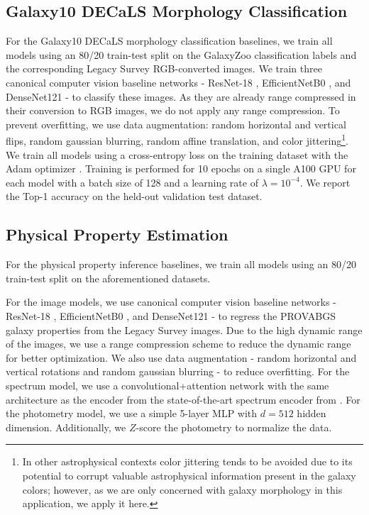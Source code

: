 \subsection{Galaxy10 DECaLS Morphology Classification}
\label{subsec:gz10_baseline}
For the Galaxy10 DECaLS morphology classification baselines, we train all models using an 80/20 train-test split on the GalaxyZoo classification labels and the corresponding Legacy Survey RGB-converted images. We train three canonical computer vision baseline networks - ResNet-18 \citep{he2016deep}, EfficientNetB0 \citep{efficientnet}, and DenseNet121 \citep{huang2017densely} - to classify these images. As they are already range compressed in their conversion to RGB images, we do not apply any range compression. To prevent overfitting, we use data augmentation: random horizontal and vertical flips, random gaussian blurring, random affine translation, and color jittering\footnote{In other astrophysical contexts color jittering tends to be avoided due to its potential to corrupt valuable astrophysical information present in the galaxy colors; however, as we are only concerned with galaxy morphology in this application, we apply it here.}. We train all models using a cross-entropy loss on the training dataset with the Adam optimizer \citep{kingma2014adam}. Training is performed for 10 epochs on a single A100 GPU for each model with a batch size of 128 and a learning rate of $\lambda=10^{-4}$. We report the Top-1 accuracy on the held-out validation test dataset.


\subsection{Physical Property Estimation}
\label{app:physical-property-baselines}
For the physical property inference baselines, we train all models using an 80/20 train-test split on the aforementioned datasets. 

For the image models, we use canonical computer vision baseline networks - ResNet-18 \citep{he2016deep}, EfficientNetB0 \citep{efficientnet}, and DenseNet121 \citep{huang2017densely} - to regress the PROVABGS galaxy properties from the Legacy Survey images. Due to the high dynamic range of the images, we use a range compression scheme to reduce the dynamic range for better optimization. We also use data augmentation - random horizontal and vertical rotations and random gaussian blurring - to reduce overfitting. For the spectrum model, we use a convolutional+attention network with the same architecture as the encoder from the state-of-the-art spectrum encoder from \citep{melchior2023autoencoding}. For the photometry model, we use a simple 5-layer MLP with $d=512$ hidden dimension. Additionally, we $Z$-score the photometry to normalize the data.

